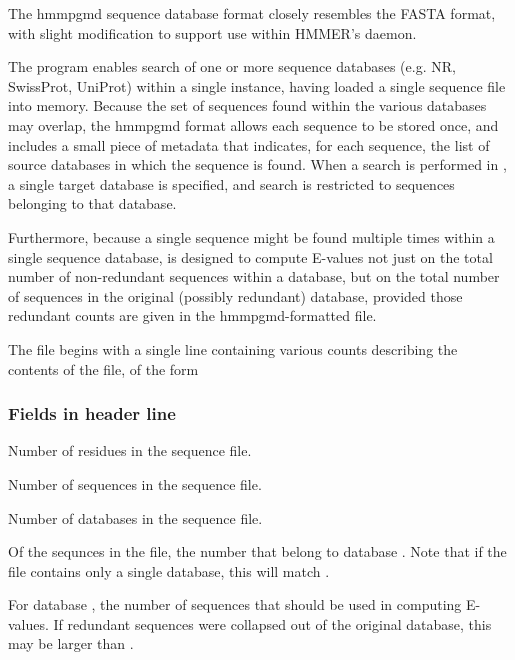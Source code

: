 The hmmpgmd sequence database format closely resembles the 
FASTA format, with slight modification to support use within HMMER's
 daemon. 


The  program enables search of one or more sequence 
databases (e.g. NR, SwissProt, UniProt) within a single instance,
having loaded a single sequence file into memory. Because the set of 
sequences found within the various databases may overlap, the hmmpgmd 
format allows each sequence to be stored once, and includes a small piece of
metadata that indicates, for each sequence, the list of source databases in
which the sequence is found. When a search is performed in , a
single target database is specified, and search is restricted to sequences
belonging to that database.

Furthermore, because a single sequence might be found multiple times
within a single sequence database,  is designed to compute
E-values not just on the total number of non-redundant sequences
within a database, but on the total number of sequences in the original
(possibly redundant) database, provided those redundant counts are
given in the hmmpgmd-formatted file.

The  file begins with a single line containing various counts
describing the contents of the file, of the form


\subsubsection{Fields in header line}

\begin{sreitems}{}

\item [\emprog{res\_cnt}] Number of residues in the sequence file.

\item [\emprog{seq\_cnt}] Number of sequences in the sequence file. 

\item [\emprog{db\_cnt}] Number of databases in the sequence file. 

\item [\emprog{cnt\_i}] Of the sequnces in the file, the number that belong to
database . Note that if the file contains only a single
database, this will match .
 
\item [\emprog{fullcnt\_i}] For database , the number of sequences
that should be used in computing E-values. If redundant 
sequences were collapsed out of the original database, this may be 
larger than .  

\end{sreitems}


